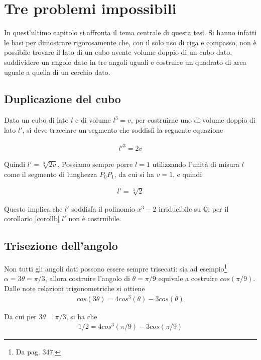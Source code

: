 \chapter{Tre problemi impossibili}

In quest'ultimo capitolo si affronta il tema centrale di questa tesi. Si hanno infatti le basi per dimostrare rigorosamente che, con il solo uso di riga e compasso, non è possibile trovare il lato di un cubo avente volume doppio di un cubo dato, suddividere un angolo dato in tre angoli uguali e costruire un quadrato di area uguale a quella di un cerchio dato.


\section{Duplicazione del cubo}
Dato un cubo di lato $l$ e di volume $l^3 = v$, per costruirne uno di volume doppio di lato $l'$, si deve tracciare un segmento che soddisfi la seguente equazione

\begin{align*}
l'^3 = 2v
\end{align*}

Quindi $l' = \sqrt[3]{2v}$. Possiamo sempre porre $l = 1$ utilizzando l'unità di misura $l$ come il segmento di lunghezza $P_0 P_1$, da cui si ha $v = 1$, e quindi 

\begin{align*}
l' = \sqrt[3]{2}
\end{align*}

Questo implica che $l'$ soddisfa il polinomio $x^3 - 2$ irriducibile su $\mathbb{Q}$; per il corollario \ref{corollb} $l'$ non è costruibile.


\section{Trisezione dell'angolo}
Non tutti gli angoli dati possono essere sempre trisecati: sia ad esempio\footnote{Da \cite{cattaneo} pag. $347$. } $\alpha = 3\theta = \pi / 3$, allora costruire l'angolo di $\theta = \pi / 9$ equivale a costruire $cos(\pi / 9)$. 
Dalle note relazioni trigonometriche si ottiene
\begin{align*}
cos(3\theta) = 4 cos^3(\theta) - 3 cos(\theta)
\end{align*}

Da cui per $3\theta = \pi / 3$, si ha che
\begin{align*}
1/2 = 4 cos^3(\pi / 9) - 3 cos(\pi / 9)
\end{align*}

